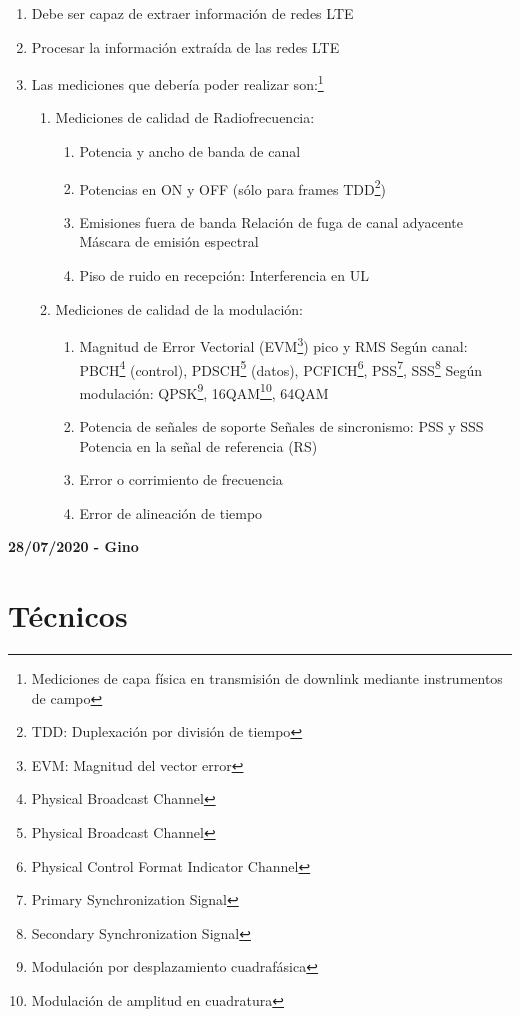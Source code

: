 \documentclass[a4paper,12pt]{report} %
\begin{document}
\begin{enumerate}
	\item Debe ser capaz de extraer información de redes LTE
	\item Procesar la información extraída de las redes LTE
	\item Las mediciones que debería poder realizar son:\footnote{Mediciones de capa física en transmisión de downlink mediante instrumentos de campo}
		\begin{enumerate}
			\item Mediciones de calidad de Radiofrecuencia:
				\begin{enumerate}
					\item Potencia y ancho de banda de canal
					\item Potencias en ON y OFF (sólo para frames TDD\footnote{TDD: Duplexación por división de tiempo})
					\item Emisiones fuera de banda
						\subitem Relación de fuga de canal adyacente
						\subitem Máscara de emisión espectral
					\item Piso de ruido en recepción: Interferencia en UL
				\end{enumerate}
			\item Mediciones de calidad de la modulación:
				\begin{enumerate}
					\item Magnitud de Error Vectorial (EVM\footnote{EVM: Magnitud del vector error}) pico y RMS
						\subitem Según canal: PBCH\footnote{Physical Broadcast Channel} (control), PDSCH\footnote{Physical Broadcast Channel} (datos), PCFICH\footnote{Physical Control Format Indicator Channel}, PSS\footnote{Primary Synchronization Signal}, SSS\footnote{Secondary Synchronization Signal}
						\subitem Según modulación: QPSK\footnote{Modulación por desplazamiento cuadrafásica}, 16QAM\footnote{Modulación de amplitud en cuadratura}, 64QAM
					\item Potencia de señales de soporte
						\subitem Señales de sincronismo: PSS y SSS
						\subitem Potencia en la señal de referencia (RS)
					\item Error o corrimiento de frecuencia
					\item Error de alineación de tiempo
				\end{enumerate}
		\end{enumerate}
\end{enumerate}


\textbf{28/07/2020 - Gino}

\section{Técnicos}
\end{document}
